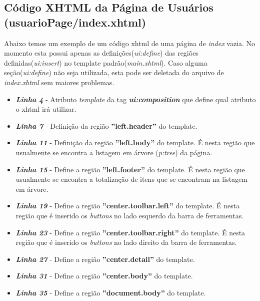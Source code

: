 \documentclass[a4paper,10pt]{article}
\begin{document}
\subsection{Código XHTML da Página de Usuários (usuarioPage/index.xhtml)}
Abaixo temos um exemplo de um código xhtml de uma página de \emph{index} vazia.
No momento esta possui apenas as definições(\emph{ui:define}) das regiões
definidas(\emph{ui:insert}) no template padrão(\emph{main.xhtml}). Caso alguma
seção(\emph{ui:define}) não seja utilizada, esta pode ser deletada do arquivo de
\emph{index.xhtml} sem maiores problemas.
	 
		\begin{itemize}
  			\item \textbf{\emph{Linha 4}} - Atributo \emph{template} da tag
  			\textbf{\emph{ui:composition}} que define qual atributo o xhtml irá
  			utilizar.
  			\item \textbf{\emph{Linha 7}} - Definição da região
  			\textbf{''left.header''} do template.
  			\item \textbf{\emph{Linha 11}} - Definição da região \textbf{''left.body''}
  			do template. É nesta região que usualmente se encontra a listagem em árvore
  			(\emph{p:tree}) da página.
  			\item \textbf{\emph{Linha 15}} - Define a região \textbf{''left.footer''}
  			do template. É nesta região que usualmente se encontra a totalização de itens
  			que se encontram na listagem em árvore.
  			\item \textbf{\emph{Linha 19}} - Define a região
  			\textbf{''center.toolbar.left''} do template. É nesta região que é inserido
  			os \emph{buttons} no lado esquerdo da barra de ferramentas. 
  			\item \textbf{\emph{Linha 23}} - Define a região
  			\textbf{''center.toolbar.right''} do template. É nesta região que é
  			inserido os \emph{buttons} no lado direito da barra de ferramentas.
  			\item \textbf{\emph{Linha 27}} - Define a região \textbf{''center.detail''}
  			do template.
  			\item \textbf{\emph{Linha 31}} - Define a região \textbf{''center.body''}
  			do template.
  			\item \textbf{\emph{Linha 35}} - Define a região \textbf{''document.body''}
  			do template.
		\end{itemize}

% 
%
\end{document}
